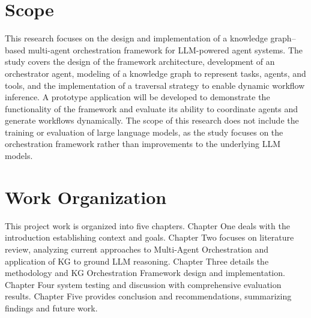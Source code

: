 \section{Scope}
This research focuses on the design and implementation of a knowledge graph–based multi-agent orchestration framework for LLM-powered agent systems. The study covers the design of the framework architecture, development of an orchestrator agent, modeling of a knowledge graph to represent tasks, agents, and tools, and the implementation of a traversal strategy to enable dynamic workflow inference.
A prototype application will be developed to demonstrate the functionality of the framework and evaluate its ability to coordinate agents and generate workflows dynamically. The scope of this research does not include the training or evaluation of large language models, as the study focuses on the orchestration framework rather than improvements to the underlying LLM models.

\section{Work Organization}
This project work is organized into five chapters. Chapter One deals with the introduction establishing context and goals. Chapter Two focuses on literature review, analyzing current approaches to Multi-Agent Orchestration and application of KG to ground LLM reasoning.  Chapter Three details the methodology and KG Orchestration Framework design and implementation. Chapter Four system testing and discussion with comprehensive evaluation results. Chapter Five provides conclusion and recommendations, summarizing findings and future work. 
